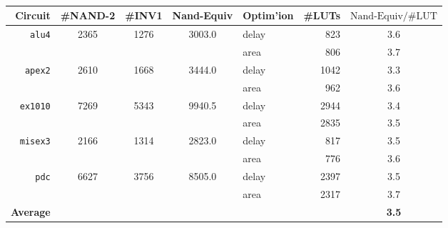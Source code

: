 \documentclass[12pt]{article}
\begin{document}
\section{}
\begin{table}[H]\centering\begin{tabular}{ r *3c || l  r | c }
\hline\hline
Circuit & \#NAND-2 & \#INV1 & Nand-Equiv & Optim'ion & \#LUTs & \({\text{Nand-Equiv}}/{\text{\#LUT}}\) \\
\hline
\texttt{alu4}   & 2365 & 1276 & 3003.0 & delay &  823 &  3.6 \\
                &      &      &        & area  &  806 &  3.7 \\
\texttt{apex2}  & 2610 & 1668 & 3444.0 & delay & 1042 &  3.3 \\
                &      &      &        & area  &  962 &  3.6 \\
\texttt{ex1010} & 7269 & 5343 & 9940.5 & delay & 2944 &  3.4 \\
                &      &      &        & area  & 2835 &  3.5 \\
\texttt{misex3} & 2166 & 1314 & 2823.0 & delay &  817 &  3.5 \\
                &      &      &        & area  &  776 &  3.6 \\
\texttt{pdc}    & 6627 & 3756 & 8505.0 & delay & 2397 &  3.5 \\
                &      &      &        & area  & 2317 &  3.7 \\
\hline
\textbf{Average}&      &      &        &       &      & \textbf{3.5} \\
\hline\hline
\end{tabular}\caption{}\label{tab:nand-equiv}\end{table}
\end{document}
